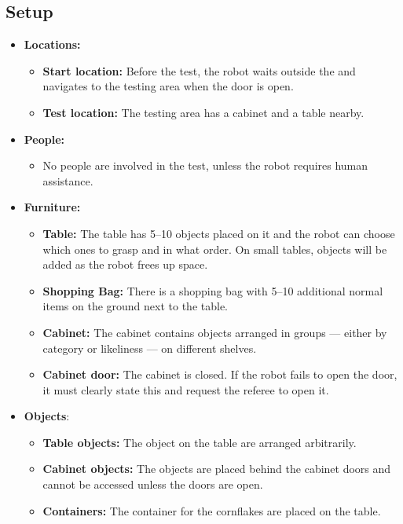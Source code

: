 \subsection*{Setup}
\begin{itemize}
	\item \textbf{Locations:}
		\begin{itemize}
			\item \textbf{Start location:} Before the test, the robot waits outside the \Arena{} and navigates to the testing area when the door is open.
			\item \textbf{Test location:} The testing area has a cabinet and a table nearby.
		\end{itemize}
	\item \textbf{People:}
		\begin{itemize}
			\item No people are involved in the test, unless the robot requires human assistance.
		\end{itemize}
	\item \textbf{Furniture:}
		\begin{itemize}
			\item \textbf{Table:} The table has 5--10 objects placed on it and the robot can choose which ones to grasp and in what order. On small tables, objects will be added as the robot frees up space.
			\item \textbf{Shopping Bag:} There is a shopping bag with 5--10 additional normal items on the ground next to the table.
			\item \textbf{Cabinet:} The cabinet contains objects arranged in groups --- either by category or likeliness --- on different shelves.
			\item \textbf{Cabinet door:} The cabinet is closed. If the robot fails to open the door, it must clearly state this and request the referee to open it.
		\end{itemize}
	\item \textbf{Objects}:
		\begin{itemize}
			\item \textbf{Table objects:} The object on the table are arranged arbitrarily.
			\item \textbf{Cabinet objects:} The objects are placed behind the cabinet doors and cannot be accessed unless the doors are open.
			\item \textbf{Containers:} The container for the cornflakes are placed on the table.
		\end{itemize}
\end{itemize}


